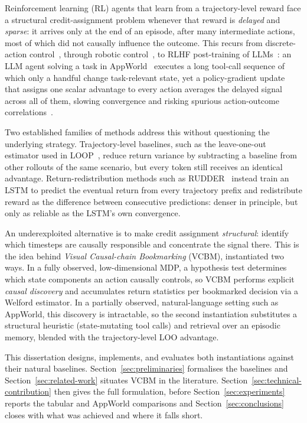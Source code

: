 Reinforcement learning (RL) agents that learn from a trajectory-level reward face a structural credit-assignment problem whenever that reward is \emph{delayed} and \emph{sparse}: it arrives only at the end of an episode, after many intermediate actions, most of which did not causally influence the outcome. This recurs from discrete-action control~\cite{mnih2015dqn}, through robotic control~\cite{lillicrap2016ddpg,silver2017alphazero}, to RLHF post-training of LLMs~\cite{christiano2017rlhf,bai2022hhrlhf,ouyang2022instructgpt}: an LLM agent solving a task in AppWorld~\cite{trivedi2024appworld} executes a long tool-call sequence of which only a handful change task-relevant state, yet a policy-gradient update that assigns one scalar advantage to every action averages the delayed signal across all of them, slowing convergence and risking spurious action-outcome correlations~\cite{amodei2016concrete,chang2020invariant}.

Two established families of methods address this without questioning the underlying strategy. Trajectory-level baselines, such as the leave-one-out estimator used in LOOP~\cite{chen2025loop}, reduce return variance by subtracting a baseline from other rollouts of the same scenario, but every token still receives an identical advantage. Return-redistribution methods such as RUDDER~\cite{arjonaibarra2019rudder} instead train an LSTM to predict the eventual return from every trajectory prefix and redistribute reward as the difference between consecutive predictions: denser in principle, but only as reliable as the LSTM's own convergence.

An underexploited alternative is to make credit assignment \emph{structural}: identify which timesteps are causally responsible and concentrate the signal there. This is the idea behind \emph{Visual Causal-chain Bookmarking} (VCBM), instantiated two ways. In a fully observed, low-dimensional MDP, a hypothesis test determines which state components an action causally controls, so VCBM performs explicit \emph{causal discovery} and accumulates return statistics per bookmarked decision via a Welford estimator. In a partially observed, natural-language setting such as AppWorld, this discovery is intractable, so the second instantiation substitutes a structural heuristic (state-mutating tool calls) and retrieval over an episodic memory, blended with the trajectory-level LOO advantage.

This dissertation designs, implements, and evaluates both instantiations against their natural baselines. Section~\ref{sec:preliminaries} formalises the baselines and Section~\ref{sec:related-work} situates VCBM in the literature. Section~\ref{sec:technical-contribution} then gives the full formulation, before Section~\ref{sec:experiments} reports the tabular and AppWorld comparisons and Section~\ref{sec:conclusions} closes with what was achieved and where it falls short.


